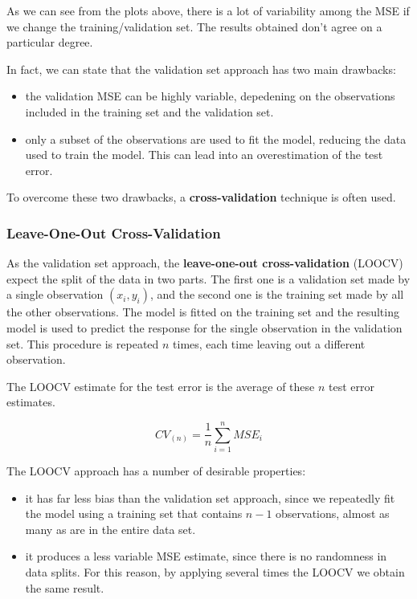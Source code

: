 As we can see from the plots above, there is a lot of variability among the MSE if we change the training/validation set. The results obtained don't agree on a particular degree. 

In fact, we can state that the validation set approach has two main drawbacks:
\begin{itemize}
    \item the validation MSE can be highly variable, depedening on the observations included in the training set and the validation set. 
    \item only a subset of the observations are used to fit the model, reducing the data used to train the model. This can lead into an overestimation of the test error.
\end{itemize}
To overcome these two drawbacks, a \textbf{cross-validation} technique is often used.

\subsubsection*{Leave-One-Out Cross-Validation}
As the validation set approach, the \textbf{leave-one-out cross-validation} (LOOCV) expect the split of the data in two parts. 
The first one is a validation set made by a single observation $(x_i, y_i)$, and the second one is the training set made by all the other observations. The model is fitted on the training set and the resulting model is used to predict the response for the single observation in the validation set.
This procedure is repeated $n$ times, each time leaving out a different observation. 

The LOOCV estimate for the test error is the average of these $n$ test error estimates.

\[
    CV_{(n)} = \frac{1}{n} \sum_{i=1}^{n} MSE_i
\]

The LOOCV approach has a number of desirable properties:
\begin{itemize}
    \item it has far less bias than the validation set approach, since we repeatedly fit the model using a training set that contains $n-1$ observations, almost as many as are in the entire data set.
    \item it produces a less variable MSE estimate, since there is no randomness in data splits. For this reason, by applying several times the LOOCV we obtain the same result.
\end{itemize}

